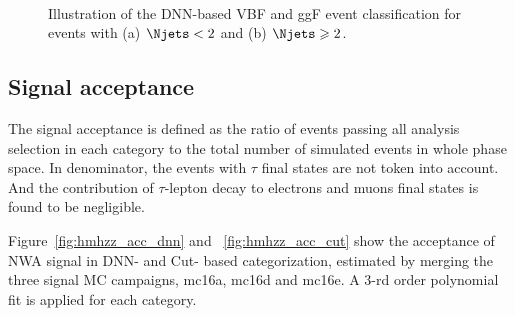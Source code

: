 \begin{figure}[h]
\centering
{}
\\
\caption{Illustration of the DNN-based VBF and ggF event classification for events with (a) $\Njets < 2$ and (b) $\Njets \geq 2$.}
\label{fig:hmhzz_dnncate}
\end{figure}

\subsection{Signal acceptance} 
The signal acceptance is defined as the ratio of events passing all analysis selection in each category to the total number of simulated events in whole phase space.
In denominator, the events with $\tau$ final states are not token into account.
And the contribution of $\tau$-lepton decay to electrons and muons final states is found to be negligible.

Figure~\ref{fig:hmhzz_acc_dnn} and ~\ref{fig:hmhzz_acc_cut} show the acceptance of NWA signal in DNN- and Cut- based categorization, estimated by merging the three signal MC campaigns, mc16a, mc16d and mc16e.
A 3-rd order polynomial fit is applied for each category.

